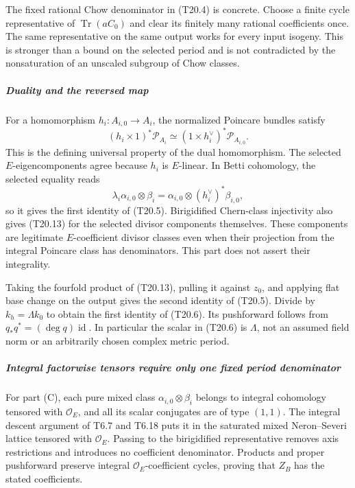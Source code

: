 \documentclass[11pt,a4paper]{article}
\theoremstyle{definition}
\begin{document}
The fixed rational Chow denominator in (T20.4) is concrete. Choose a finite cycle representative of \(\operatorname{Tr}(a C_0)\) and clear its finitely many rational coefficients once. The same representative on the same output works for every input isogeny. This is stronger than a bound on the selected period and is not contradicted by the nonsaturation of an unscaled subgroup of Chow classes.

\subparagraph{Duality and the reversed map}\label{duality-and-the-reversed-map}

For a homomorphism \(h_i:A_{i,0}\to A_i\), the normalized Poincare bundles satisfy \[
 (h_i\times1)^*\mathcal P_{A_i}
   \simeq (1\times h_i^\vee)^*\mathcal P_{A_{i,0}}.
 \tag{T20.13}
\] This is the defining universal property of the dual homomorphism. The selected \(E\)-eigencomponents agree because \(h_i\) is \(E\)-linear. In Betti cohomology, the selected equality reads \[
 \lambda_i\alpha_{i,0}\otimes\beta_i
   =\alpha_{i,0}\otimes(h_i^\vee)^*\beta_{i,0},
\] so it gives the first identity of (T20.5). Birigidified Chern-class injectivity also gives (T20.13) for the selected divisor components themselves. These components are legitimate \(E\)-coefficient divisor classes even when their projection from the integral Poincare class has denominators. This part does not assert their integrality.

Taking the fourfold product of (T20.13), pulling it against \(z_0\), and applying flat base change on the output gives the second identity of (T20.5). Divide by \(k_h=\Lambda k_0\) to obtain the first identity of (T20.6). Its pushforward follows from \(q_*q^*=(\deg q)\operatorname{id}\). In particular the scalar in (T20.6) is \(\Lambda\), not an assumed field norm or an arbitrarily chosen complex metric period.

\subparagraph{Integral factorwise tensors require only one fixed period denominator}\label{integral-factorwise-tensors-require-only-one-fixed-period-denominator}

For part (C), each pure mixed class \(\alpha_{i,0}\otimes\beta_i\) belongs to integral cohomology tensored with \(\mathcal O_E\), and all its scalar conjugates are of type \((1,1)\). The integral descent argument of T6.7 and T6.18 puts it in the saturated mixed Neron--Severi lattice tensored with \(\mathcal O_E\). Passing to the birigidified representative removes axis restrictions and introduces no coefficient denominator. Products and proper pushforward preserve integral \(\mathcal O_E\)-coefficient cycles, proving that \(Z_B\) has the stated coefficients.
\end{document}

